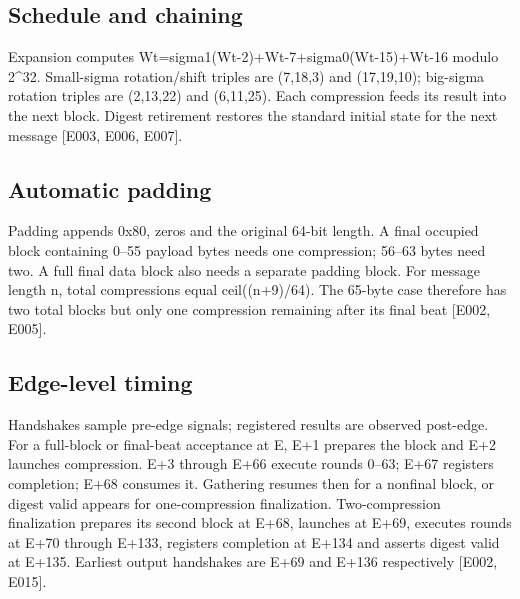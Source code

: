 \documentclass[11pt,a4paper]{article}
\begin{document}
\subsection{Schedule and chaining}

Expansion computes Wt=\allowbreak{}sigma1(\allowbreak{}Wt-2)\allowbreak{}+\allowbreak{}Wt-7+\allowbreak{}sigma0(\allowbreak{}Wt-15)\allowbreak{}+\allowbreak{}Wt-16 modulo 2\textasciicircum{}32. Small-sigma rotation/\allowbreak{}shift triples are (\allowbreak{}7,\allowbreak{}18,\allowbreak{}3)\allowbreak{} and (\allowbreak{}17,\allowbreak{}19,\allowbreak{}10)\allowbreak{}; big-sigma rotation triples are (\allowbreak{}2,\allowbreak{}13,\allowbreak{}22)\allowbreak{} and (\allowbreak{}6,\allowbreak{}11,\allowbreak{}25)\allowbreak{}. Each compression feeds its result into the next block. Digest retirement restores the standard initial state for the next message [\allowbreak{}E003,\allowbreak{} E006,\allowbreak{} E007]\allowbreak{}.

\subsection{Automatic padding}

Padding appends 0x80,\allowbreak{} zeros and the original 64-bit length. A final occupied block containing 0–55 payload bytes needs one compression; 56–63 bytes need two. A full final data block also needs a separate padding block. For message length n,\allowbreak{} total compressions equal ceil(\allowbreak{}(\allowbreak{}n+\allowbreak{}9)\allowbreak{}/\allowbreak{}64)\allowbreak{}. The 65-byte case therefore has two total blocks but only one compression remaining after its final beat [\allowbreak{}E002,\allowbreak{} E005]\allowbreak{}.

\subsection{Edge-level timing}

Handshakes sample pre-edge signals; registered results are observed post-edge. For a full-block or final-beat acceptance at E,\allowbreak{} E+\allowbreak{}1 prepares the block and E+\allowbreak{}2 launches compression. E+\allowbreak{}3 through E+\allowbreak{}66 execute rounds 0–63; E+\allowbreak{}67 registers completion; E+\allowbreak{}68 consumes it. Gathering resumes then for a nonfinal block,\allowbreak{} or digest valid appears for one-compression finalization. Two-compression finalization prepares its second block at E+\allowbreak{}68,\allowbreak{} launches at E+\allowbreak{}69,\allowbreak{} executes rounds at E+\allowbreak{}70 through E+\allowbreak{}133,\allowbreak{} registers completion at E+\allowbreak{}134 and asserts digest valid at E+\allowbreak{}135. Earliest output handshakes are E+\allowbreak{}69 and E+\allowbreak{}136 respectively [\allowbreak{}E002,\allowbreak{} E015]\allowbreak{}.
\end{document}
